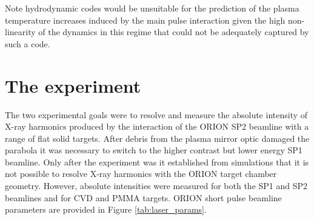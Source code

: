 Note hydrodynamic codes would be unsuitable for the prediction of the plasma temperature increases induced by the main pulse interaction given the high non-linearity of the dynamics in this regime that could not be adequately captured by such a code.


\section{\label{ch:3-sec:experiment}The experiment}
The two experimental goals were to resolve and measure the absolute intensity of X-ray harmonics produced by the interaction of the ORION SP2 beamline with a range of flat solid targets. After debris from the plasma mirror optic damaged the parabola it was necessary to switch to the higher contrast but lower energy SP1 beamline. Only after the experiment was it established from simulations that it is not possible to resolve X-ray harmonics with the ORION target chamber geometry. However, absolute intensities were measured for both the SP1 and SP2 beamlines and for CVD and PMMA targets. ORION short pulse beamline parameters are provided in Figure \ref{tab:laser_params}.

